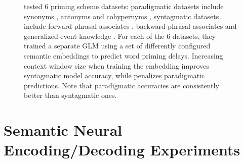 \begin{figure}
    \centering
    \caption[Impact of Context Window Size on Syntagmatic and Paradigmatic Information Extraction]{\textcite{lapesaContrastingSyntagmaticParadigmatic2014} tested 6 priming scheme datasets: paradigmatic datasets include synonyms , antonyms  and cohypernyms , syntagmatic datasets include forward phrasal associates , backward phrasal associates  and generalized event knowledge . For each of the 6 datasets, they trained a separate GLM using a set of differently configured semantic embeddings to predict word priming delays. Increasing context window size when training the embedding improves syntagmatic model accuracy, while penalizes paradigmatic predictions. Note that paradigmatic accuracies are consistently better than syntagmatic ones.} 
    \label{fig:synparacontextwindow}
\end{figure}



\section{Semantic Neural Encoding\slash Decoding Experiments}

